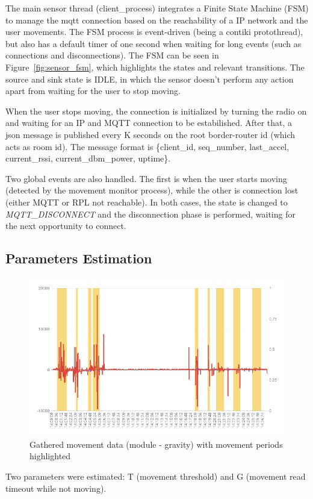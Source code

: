 \documentclass[a4paper, 11pt]{article}
\begin{document}
The main sensor thread (client\_process) integrates a Finite State Machine (FSM) to manage the mqtt connection based on the reachability of a IP network and the user movements.
The FSM process is event-driven (being a contiki protothread), but also has a default timer of one second when waiting for long events (such as connections and disconnections).
The FSM can be seen in Figure~\ref{fig:sensor_fsm}, which highlights the states and relevant transitions.
The source and sink state is IDLE, in which the sensor doesn't perform any action apart from waiting for the user to stop moving.

When the user stops moving, the connection is initialized by turning the radio on and waiting for an IP and MQTT connection to be estabilished. 
After that, a json message is published every K seconds on the root border-router id (which acts as room id).
The message format is \{client\_id, seq\_number, last\_accel, current\_rssi, current\_dbm\_power, uptime\}.

Two global events are also handled. The first is when the user starts moving (detected by the movement monitor process), while the other is connection lost (either MQTT or RPL not reachable). In both cases, the state is changed to \emph{MQTT\_DISCONNECT} and the disconnection phase is performed, waiting for the next opportunity to connect.

\subsection*{Parameters Estimation}

\begin{figure}[h]
\centering
    \includegraphics[width=0.7\linewidth]{images/accel_chart.png}
    \caption{Gathered movement data (module - gravity) with movement periods highlighted}
    \label{fig:accel_data}
\end{figure}

Two parameters were estimated: T (movement threshold) and G (movement read timeout while not moving).
\end{document}
